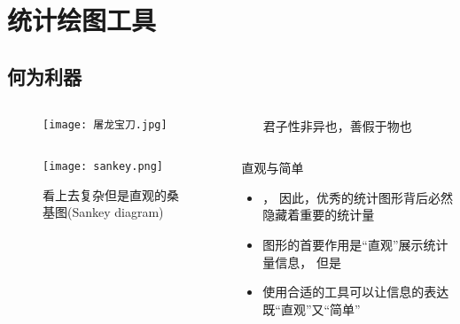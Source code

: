 
\section{统计绘图工具}
\subsection{何为利器}
\begin{frame}{\subsecname}{}

  \begin{columns}
    \begin{column}{.5\textwidth}
      \begin{figure}
        \centering \texttt{[image: 屠龙宝刀.jpg]}
      \end{figure}
    \end{column}

    \begin{column}{.5\textwidth}
      \begin{ornamentblock}
        \centering
        {君子性非异也，善假于物也\\ %
          }
      \end{ornamentblock}
    \end{column}
  \end{columns}

\end{frame}

\begin{frame}[c]{\subsecname}
  
  \begin{columns}
    \begin{column}{.5\textwidth}
      \begin{figure}
        \centering \texttt{[image: sankey.png]}
        \caption{看上去复杂但是直观的桑基图(Sankey diagram)}
      \end{figure}
    \end{column}

    \begin{column}{.5\textwidth}
      \begin{block}{\small 直观与简单} \small
        \begin{itemize}
        \item[\HandRight] ，
        因此，优秀的统计图形背后必然隐藏着重要的统计量
        \item[\HandRight] 图形的首要作用是“直观”展示统计量信息，
        但是
        \item[\HandRight] 使用合适的工具可以让信息的表达既“直观”又“简单” 
        \end{itemize}
      \end{block}
    \end{column}
  \end{columns}
    
\end{frame}

